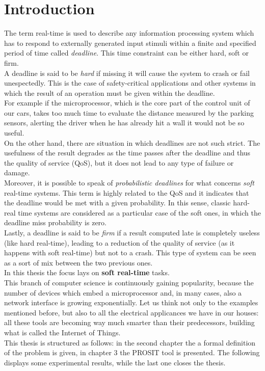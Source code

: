 \chapter{Introduction}\label{chp:introduction}


The term real-time is used to describe any information processing system which has to respond to externally generated input stimuli within a finite and specified period of time called \emph{deadline}.
This time constraint can be either hard, soft or firm.\\
A deadline is said to be \emph{hard} if missing it will cause the system to crash or fail unespectedly. This is the case of safety-critical applications and other systems in which the result of an operation must be given within the deadline.\\
For example if the microprocessor, which is the core part of the control unit of our cars, takes too much time to evaluate the distance measured by the parking sensors, alerting the driver when he has already hit a wall it would not be so useful.\\
On the other hand, there are situation in which deadlines are not such strict. The usefulness of the result degrades as the time passes after the deadline and thus the quality of service (QoS), but it does not lead to any type of failure or damage.\\
Moreover, it is possible to speak of \emph{probabilistic deadlines} for what concerns \emph{soft} real-time systems. This term is highly related to the QoS and it indicates that the deadline would be met with a given probability. In this sense, classic hard-real time systems are considered as a particular case of the soft ones, in which the deadline miss probability is zero.\\ 
Lastly, a deadline is said to be \emph{firm} if a result computed late is completely useless (like hard real-time), leading to a reduction of the quality of service (as it happens with soft real-time) but not to a crash. This type of system can be seen as a sort of mix between the two previous ones.\\
In this thesis the focus lays on \textbf{soft real-time} tasks.\\
This branch of computer science is continuously gaining popularity, because the number of devices which embed a microprocessor and, in many cases, also a network interface is growing exponentially. Let us think not only to the examples mentioned before, but also to all the electrical applicances we have in our houses: all these tools are becoming way much smarter than their predecessors, building what is called the Internet of Things.\\
This thesis is structured as follows: in the second chapter the a formal definition of the problem is given, in chapter 3 the PROSIT tool is presented. The following displays some experimental results, while the last one closes the thesis.      
